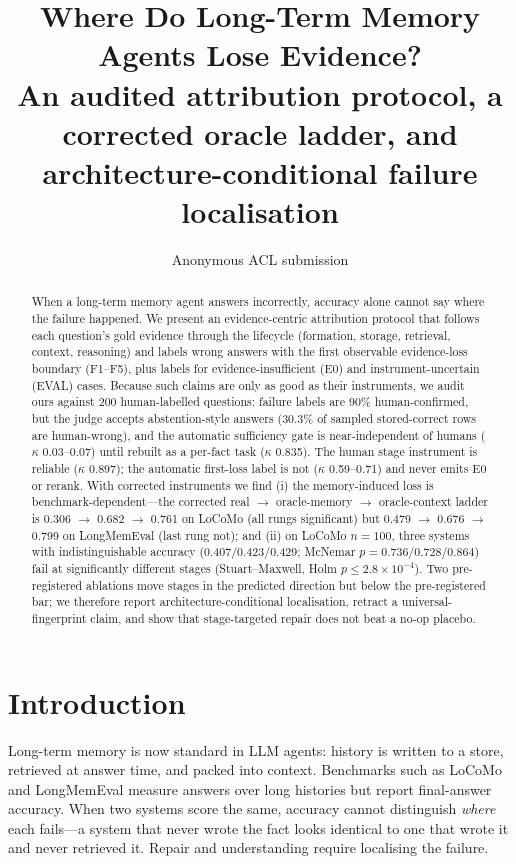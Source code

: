 \documentclass[11pt]{article}
\title{Where Do Long-Term Memory Agents Lose Evidence?\\[2pt]
\large An audited attribution protocol, a corrected oracle ladder, and
architecture-conditional failure localisation}
\author{Anonymous ACL submission}
\begin{document}
\maketitle

\begin{abstract}
When a long-term memory agent answers incorrectly, accuracy alone cannot say
where the failure happened. We present an evidence-centric attribution
protocol that follows each question's gold evidence through the lifecycle
(formation, storage, retrieval, context, reasoning) and labels wrong answers
with the first observable evidence-loss boundary (F1--F5), plus labels for
evidence-insufficient (E0) and instrument-uncertain (EVAL) cases. Because such claims are only as good as
their instruments, we audit ours against 200 human-labelled questions:
failure labels are 90\% human-confirmed, but the judge accepts
abstention-style answers (30.3\% of sampled stored-correct rows are
human-wrong), and the automatic sufficiency gate is near-independent of
humans ($\kappa$ 0.03--0.07) until rebuilt as a per-fact task
($\kappa$ 0.835). The human stage instrument is reliable ($\kappa$ 0.897);
the automatic first-loss label is not ($\kappa$ 0.59--0.71) and never emits
E0 or rerank. With corrected instruments we find (i) the memory-induced loss
is benchmark-dependent---the corrected real $\to$ oracle-memory $\to$
oracle-context ladder is 0.306 $\to$ 0.682 $\to$ 0.761 on LoCoMo (all rungs
significant) but 0.479 $\to$ 0.676 $\to$ 0.799 on LongMemEval (last rung
not); and (ii) on LoCoMo $n{=}100$, three systems with indistinguishable
accuracy (0.407/0.423/0.429; McNemar $p = 0.736/0.728/0.864$) fail at
significantly different stages (Stuart--Maxwell, Holm
$p \leq 2.8\times10^{-4}$). Two pre-registered ablations move stages in the
predicted direction but below the pre-registered bar; we therefore report
architecture-conditional localisation, retract a universal-fingerprint claim,
and show that stage-targeted repair does not beat a no-op placebo.
\end{abstract}

\section{Introduction}

Long-term memory is now standard in LLM agents: history is written to a store,
retrieved at answer time, and packed into context. Benchmarks such as LoCoMo
and LongMemEval \citep{maharana-etal-2024-locomo,wu2025longmemeval} measure
answers over long histories but report final-answer accuracy. When two systems
score the same, accuracy cannot distinguish \emph{where} each fails---a system
that never wrote the fact looks identical to one that wrote it and never
retrieved it. Repair and understanding require localising the failure.
\end{document}
